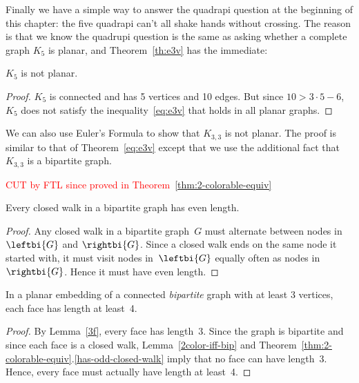 Finally we have a simple way to answer the quadrapi question at the
beginning of this chapter: the five quadrapi can't all shake hands without
crossing.  The reason is that we know the quadrupi question is the same as
asking whether a complete graph $K_5$ is planar, and 
Theorem~\ref{th:e3v} has the immediate:
\begin{corollary}\label{k5not}
$K_5$ is not planar.
\end{corollary}
\begin{proof}
  $K_5$ is connected and has 5 vertices and 10 edges.  But since $10 > 3
  \cdot 5-6$, $K_5$ does not satisfy the inequality~\eqref{eq:e3v} that
  holds in all planar graphs.
\end{proof}

We can also use Euler's Formula to show that $K_{3, 3}$ is not
planar.  The proof is similar to that of Theorem~\ref{eq:e3v} except that
we use the additional fact that $K_{3, 3}$ is a bipartite graph.

\begin{editingnotes}
\textcolor{red}{CUT by FTL since proved in Theorem~\ref{thm:2-colorable-equiv}}

\begin{lemma*}\label{lem:5D5}
Every closed walk in a bipartite graph has even length.
\end{lemma*}

\begin{proof}
Any closed walk in a bipartite graph~$G$ must alternate between nodes
in~$\leftbi{G}$ and $\rightbi{G}$.  Since a closed walk ends on the
same node it started with, it must visit nodes in~$\leftbi{G}$
equally often as nodes in~$\rightbi{G}$.  Hence it must have even
length.
\end{proof}

\begin{corollary}\label{cor:5D6}
In a planar embedding of a connected \emph{bipartite} graph with at
least 3 vertices, each face has length at least~4.
\end{corollary}
\begin{proof}
  By Lemma~\ref{3f}, every face has length~3.  Since the graph is
  bipartite and since each face is a closed walk,
  Lemma~\ref{2color-iff-bip} and
  Theorem~\ref{thm:2-colorable-equiv}.\ref{has-odd-closed-walk} imply that
  no face can have length~3.  Hence, every face must actually have length
  at least~4.
\end{proof}
\end{editingnotes}

